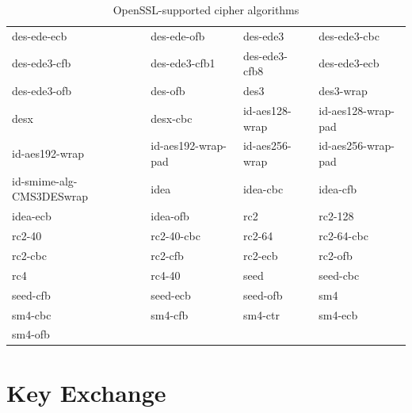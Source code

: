 \documentclass[a4paper, 12pt]{book} %
\begin{document}
\begin{table}[H]
\begin{tabular}{llll}
des-ede-ecb & des-ede-ofb & des-ede3 & des-ede3-cbc \\
des-ede3-cfb & des-ede3-cfb1 & des-ede3-cfb8 & des-ede3-ecb \\
des-ede3-ofb & des-ofb & des3 & des3-wrap \\
desx & desx-cbc & id-aes128-wrap & id-aes128-wrap-pad \\
id-aes192-wrap & id-aes192-wrap-pad & id-aes256-wrap & id-aes256-wrap-pad \\
id-smime-alg-CMS3DESwrap & idea & idea-cbc & idea-cfb \\
idea-ecb & idea-ofb & rc2 & rc2-128 \\
rc2-40 & rc2-40-cbc & rc2-64 & rc2-64-cbc \\
rc2-cbc & rc2-cfb & rc2-ecb & rc2-ofb \\
rc4 & rc4-40 & seed & seed-cbc \\
seed-cfb & seed-ecb & seed-ofb & sm4 \\
sm4-cbc & sm4-cfb & sm4-ctr & sm4-ecb \\
sm4-ofb & & & \\
\hline
\end{tabular}
\caption{OpenSSL-supported cipher algorithms}
\end{table}



\chapter{Key Exchange}
\end{document}
